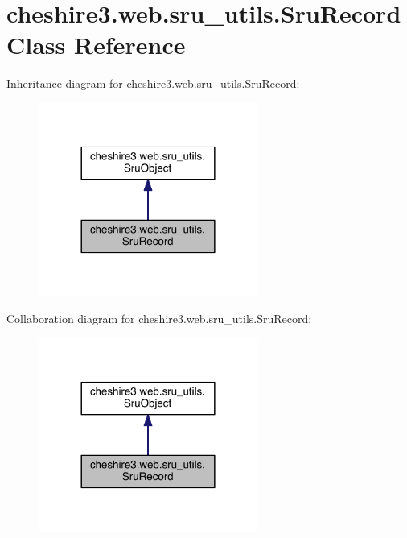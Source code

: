 \hypertarget{classcheshire3_1_1web_1_1sru__utils_1_1_sru_record}{\section{cheshire3.\-web.\-sru\-\_\-utils.\-Sru\-Record Class Reference}
\label{classcheshire3_1_1web_1_1sru__utils_1_1_sru_record}
}


Inheritance diagram for cheshire3.\-web.\-sru\-\_\-utils.\-Sru\-Record\-:
\nopagebreak
\begin{figure}[H]
\begin{center}
\leavevmode
\includegraphics[width=204pt]{classcheshire3_1_1web_1_1sru__utils_1_1_sru_record__inherit__graph}
\end{center}
\end{figure}


Collaboration diagram for cheshire3.\-web.\-sru\-\_\-utils.\-Sru\-Record\-:
\nopagebreak
\begin{figure}[H]
\begin{center}
\leavevmode
\includegraphics[width=204pt]{classcheshire3_1_1web_1_1sru__utils_1_1_sru_record__coll__graph}
\end{center}
\end{figure}
